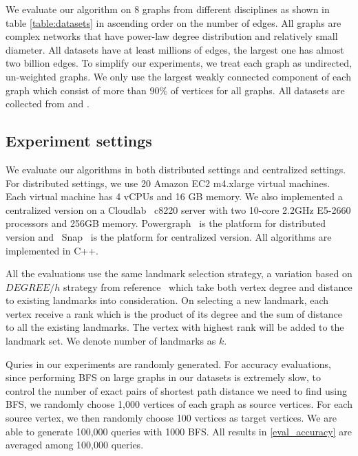 We evaluate our algorithm on 8 graphs from different disciplines as shown in table \ref{table:datasets} in ascending order on the number of edges. All graphs are complex networks that have power-law degree distribution and relatively small diameter. All datasets have at least millions of edges, the largest one has almost two billion edges. To simplify our experiments, we treat each graph as undirected, un-weighted graphs. We only use the largest weakly connected component of each graph which consist of more than $90\%$ of vertices for all graphs. All datasets are collected from \cite{snapnets} and \cite{nr}.

\subsection{Experiment settings}
\label{eval_system}

We evaluate our algorithms in both distributed settings and centralized settings.
For distributed settings, we use 20 Amazon EC2 m4.xlarge virtual machines. Each virtual machine has 4 vCPUs and 16 GB memory. We also implemented a centralized version on a Cloudlab~\cite{RicciEide:login14} c8220 server with two 10-core 2.2GHz E5-2660 processors and 256GB memory. Powergraph~\cite{180251} is the platform for distributed version and ~Snap~\cite{snapnets} is the platform for centralized version. All algorithms are implemented in C++. 

All the evaluations use the same landmark selection strategy, a variation based on $DEGREE/h$ strategy from reference~\cite{Potamias:2009:FSP:1645953.1646063} which take both vertex degree and distance to existing landmarks into consideration. On selecting a new landmark, each vertex receive a rank which is the product of its degree and the sum of distance to all the existing landmarks. The vertex with highest rank will be added to the landmark set. We denote number of landmarks as $k$.

Quries in our experiments are randomly generated. For accuracy evaluations, since performing BFS on large graphs in our datasets is extremely slow, to control the number of exact pairs of shortest path distance we need to find using BFS, we randomly choose 1,000 vertices of each graph as source vertices. For each source vertex, we then randomly choose 100 vertices as target vertices. We are able to generate 100,000 queries with 1000 BFS. All results in \ref{eval_accuracy} are averaged among 100,000 queries.


